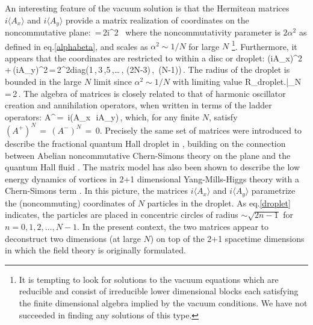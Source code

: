 An interesting feature of the vacuum solution is that the Hermitean matrices $i\langle A_x\rangle$ and $i\langle A_y\rangle$ provide a matrix realization of coordinates on the noncommutative plane:
\be
{}\,=\,2i\alpha^2 \,
\ee
where the noncommutativity parameter is $2\alpha^2$ as defined in eq.\eqref{alphabeta}, and scales as $\alpha^2\sim 1/N$ for large $N$
\footnote{ It is tempting to look for solutions to the vacuum equations which are reducible and consist of irreducible lower dimensional blocks each satisfying the finite dimensional algebra  implied by the vacuum conditions.   We have not succeeded in finding any solutions of this type.}. Furthermore, it appears that the coordinates are restricted to within a disc or droplet: 
\be
\left(i\langle A_x\rangle\right)^2\,+\,\left(i\langle A_y\rangle\right)^2\,=\,2\alpha^2{\rm diag}\left(1\,,\,3\,,5\,,\ldots\,, (2N-3)\,,\, (N-1)\right)\,.\label{droplet}
\ee
The radius of the droplet is bounded in the large $N$ limit since $\alpha^2 \sim 1/N$ with limiting value
\be
R_{\rm droplet}\left.\right|_{N\to\infty}\,=\,2\beta{}\,.
\ee
The algebra of matrices is closely related to that of harmonic oscillator creation and annihilation operators, when written in terms of the ladder operators:
\be
A^\pm\,=\, i\left(\langle A_x\rangle \,\pm\, i\langle A_y\rangle\right)\,,
\ee
which, for any finite $N$, satisfy $(A^+)^N\,=\,(A^-)^N\,=\,0$.
Precisely the same set of matrices were introduced to describe the  fractional quantum Hall droplet in \cite{Polychronakos:2001mi}, building on the connection between Abelian noncommutative Chern-Simons theory on the plane and the quantum Hall fluid \cite{Susskind:2001fb}. The matrix model has also been shown to describe the low energy dynamics of vortices in 2+1 dimensional Yang-Mills-Higgs theory with a Chern-Simons term \cite{Tong:2003vy, Tong:2015xaa}.
In this picture, the matrices $i\langle A_x \rangle$ and $i\langle A_y\rangle $ parametrize the (noncommuting) coordinates of $N$ particles in the droplet.  As eq.\eqref{droplet} indicates, the particles are placed in concentric circles of radius $\sim \sqrt{2n-1}$ for $n=0,1,2,\ldots, N-1$. In the present context, the two matrices appear to deconstruct two dimensions (at large $N$) on top of the 2+1 spacetime dimensions in which the field theory is originally formulated. 

